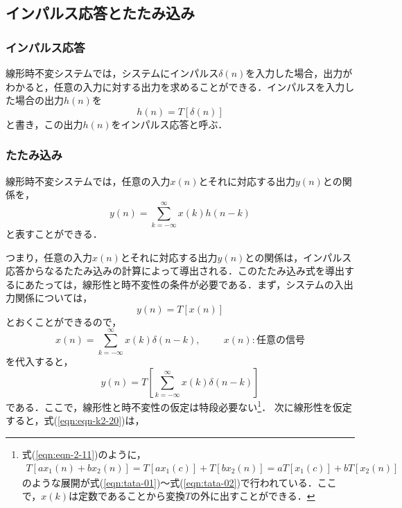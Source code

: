 \subsection{インパルス応答とたたみ込み}

\subsubsection{インパルス応答}

線形時不変システムでは，システムにインパルス$\delta(n)$を入力した場合，出力がわかると，任意の入力に対する出力を求めることができる．インパルスを入力した場合の出力$h(n)$を
\begin{equation}
h(n)=T[\delta(n)]
\end{equation}
と書き，この出力$h(n)$をインパルス応答と呼ぶ．

\subsubsection{たたみ込み}

線形時不変システムでは，任意の入力$x(n)$とそれに対応する出力$y(n)$との関係を，
\begin{equation}
y(n)=\sum_{k=-\infty}^{\infty}x(k)h(n-k)
\label{eqn:tata-00}
\end{equation}
と表すことができる．

つまり，任意の入力$x(n)$とそれに対応する出力$y(n)$との関係は，インパルス応答からなるたたみ込みの計算によって導出される．このたたみ込み式を導出するにあたっては，線形性と時不変性の条件が必要である．まず，システムの入出力関係については，
\begin{equation}
y(n)=T[x(n)]
\end{equation}
とおくことができるので，
\begin{equation}
x(n)=\sum_{k=-\infty}^{\infty}x(k)\delta(n-k), \hspace{1cm} x(n):任意の信号
\end{equation}
を代入すると，
\begin{equation}
y(n)=T[\sum_{k=-\infty}^{\infty}x(k)\delta(n-k)]
\label{eqn:eqn-k2-20}
\end{equation}
である．ここで，線形性と時不変性の仮定は特段必要ない\footnote{式(\ref{eqn:eqn-2-11})のように，
\begin{eqnarray}
 T[ax_1(n)+bx_2(n)] 
 = T[ax_1(c)]+T[bx_2(n)] 
 = aT[x_1(c)]+bT[x_2(n)] \nonumber
\end{eqnarray}
のような展開が式(\ref{eqn:tata-01})～式(\ref{eqn:tata-02})で行われている．ここで，$x(k)$は定数であることから変換$T$の外に出すことができる．}．
次に線形性を仮定すると，式(\ref{eqn:eqn-k2-20})は，

